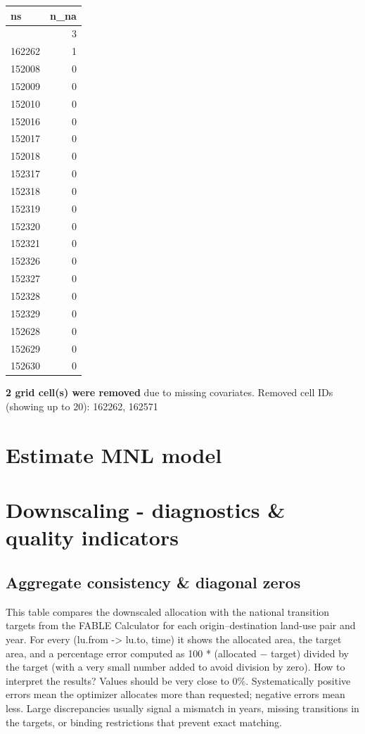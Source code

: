 \documentclass[
]{article}
\begin{document}
\begin{longtable}[]{@{}lr@{}}
\toprule\noalign{}
ns & n\_na \\
\midrule\noalign{}
\endhead
\bottomrule\noalign{}
\endlastfoot
162571 & 3 \\
162262 & 1 \\
152008 & 0 \\
152009 & 0 \\
152010 & 0 \\
152016 & 0 \\
152017 & 0 \\
152018 & 0 \\
152317 & 0 \\
152318 & 0 \\
152319 & 0 \\
152320 & 0 \\
152321 & 0 \\
152326 & 0 \\
152327 & 0 \\
152328 & 0 \\
152329 & 0 \\
152628 & 0 \\
152629 & 0 \\
152630 & 0 \\
\end{longtable}

\textbf{2 grid cell(s) were removed} due to missing covariates. Removed
cell IDs (showing up to 20): 162262, 162571

\section{Estimate MNL model}\label{estimate-mnl-model}

\section{Downscaling - diagnostics \& quality
indicators}\label{downscaling---diagnostics-quality-indicators}

\subsection{Aggregate consistency \& diagonal
zeros}\label{aggregate-consistency-diagonal-zeros}

This table compares the downscaled allocation with the national
transition targets from the FABLE Calculator for each
origin--destination land-use pair and year. For every (lu.from
-\textgreater{} lu.to, time) it shows the allocated area, the target
area, and a percentage error computed as 100 * (allocated − target)
divided by the target (with a very small number added to avoid division
by zero). How to interpret the results? Values should be very close to
0\%. Systematically positive errors mean the optimizer allocates more
than requested; negative errors mean less. Large discrepancies usually
signal a mismatch in years, missing transitions in the targets, or
binding restrictions that prevent exact matching.
\end{document}
